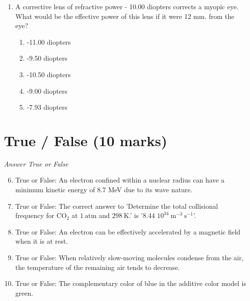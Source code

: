 \documentclass[12pt]{article}
\begin{document}
\begin{enumerate}[label=\arabic*.]
\begin{enumerate}[label=(\alph*)]
    \item slightly increases
    \item is halved
    \item becomes zero
    \item greatly decreases
\end{enumerate}
\item A corrective lens of refractive power - 10.00 diopters corrects a myopic eye. What would be the effective power of this lens if it were 12 mm. from the eye?
\begin{enumerate}[label=(\alph*)]
    \item -11.00 diopters
    \item -9.50 diopters
    \item -10.50 diopters
    \item -9.00 diopters
    \item -7.93 diopters
\end{enumerate}
\end{enumerate}

\section*{True / False (10 marks)}
\textit{Answer True or False}
\begin{enumerate}[label=\arabic*.]
\setcounter{enumi}{5}
\item True or False: An electron confined within a nuclear radius can have a minimum kinetic energy of 8.7 MeV due to its wave nature.
\item True or False: The correct answer to 'Determine the total collisional frequency for $\mathrm{CO}_2$ at $1 \mathrm{~atm}$ and $298 \mathrm{~K}$.' is '8.44 $10^{34} \mathrm{~m}^{-3} \mathrm{~s}^{-1}$'.
\item True or False: An electron can be effectively accelerated by a magnetic field when it is at rest.
\item True or False: When relatively slow-moving molecules condense from the air, the temperature of the remaining air tends to decrease.
\item True or False: The complementary color of blue in the additive color model is green.
\end{enumerate}
\end{document}
